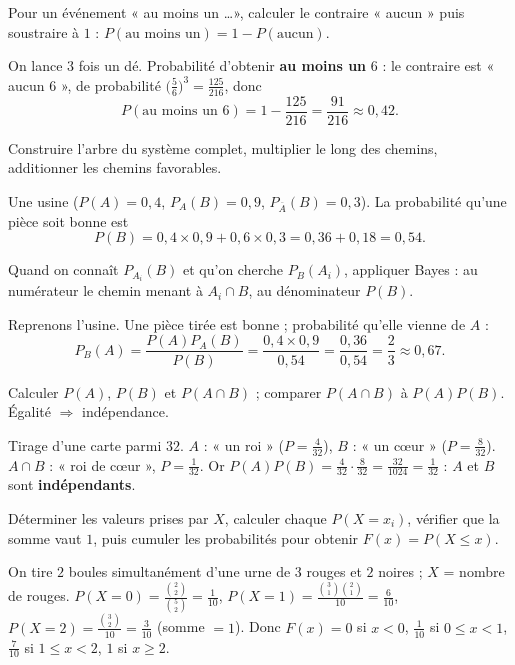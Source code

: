Pour un événement « au moins un \dots », calculer le contraire « aucun » puis
soustraire à $1$ : $P(\text{au moins un})=1-P(\text{aucun})$.
\begin{exemple}
On lance $3$ fois un dé. Probabilité d'obtenir \textbf{au moins un} $6$ : le
contraire est « aucun $6$ », de probabilité $\big(\frac56\big)^3=\frac{125}{216}$,
donc
\[
P(\text{au moins un }6)=1-\frac{125}{216}=\frac{91}{216}\approx0{,}42.
\]
\end{exemple}

Construire l'arbre du système complet, multiplier le long des chemins, additionner
les chemins favorables.
\begin{exemple}
Une usine ($P(A){=}0{,}4$, $P_A(B){=}0{,}9$, $P_{\overline A}(B){=}0{,}3$). La
probabilité qu'une pièce soit bonne est
\[
P(B)=0{,}4\times0{,}9+0{,}6\times0{,}3=0{,}36+0{,}18=0{,}54.
\]
\end{exemple}

Quand on connaît $P_{A_i}(B)$ et qu'on cherche $P_B(A_i)$, appliquer Bayes : au
numérateur le chemin menant à $A_i\cap B$, au dénominateur $P(B)$.
\begin{exemple}
Reprenons l'usine. Une pièce tirée est bonne ; probabilité qu'elle vienne de $A$ :
\[
P_B(A)=\frac{P(A)P_A(B)}{P(B)}=\frac{0{,}4\times0{,}9}{0{,}54}=\frac{0{,}36}{0{,}54}=\frac23\approx0{,}67.
\]
\end{exemple}

Calculer $P(A)$, $P(B)$ et $P(A\cap B)$ ; comparer $P(A\cap B)$ à $P(A)P(B)$.
Égalité $\Rightarrow$ indépendance.
\begin{exemple}
Tirage d'une carte parmi $32$. $A$ : « un roi » ($P=\frac4{32}$), $B$ : « un
c\oe ur » ($P=\frac8{32}$). $A\cap B$ : « roi de c\oe ur », $P=\frac1{32}$. Or
$P(A)P(B)=\frac4{32}\cdot\frac8{32}=\frac{32}{1024}=\frac1{32}$ : $A$ et $B$ sont
\textbf{indépendants}.
\end{exemple}

Déterminer les valeurs prises par $X$, calculer chaque $P(X=x_i)$, vérifier que la
somme vaut $1$, puis cumuler les probabilités pour obtenir $F(x)=P(X\le x)$.
\begin{exemple}
On tire $2$ boules simultanément d'une urne de $3$ rouges et $2$ noires ; $X$ =
nombre de rouges. $P(X{=}0)=\frac{\binom22}{\binom52}=\frac1{10}$,
$P(X{=}1)=\frac{\binom31\binom21}{10}=\frac6{10}$,
$P(X{=}2)=\frac{\binom32}{10}=\frac3{10}$ (somme $=1$). Donc $F(x)=0$ si $x<0$,
$\frac1{10}$ si $0\le x<1$, $\frac7{10}$ si $1\le x<2$, $1$ si $x\ge2$.
\end{exemple}

